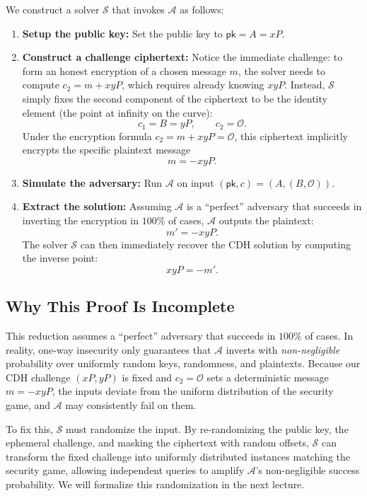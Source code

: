 We construct a solver \(\mathcal{S}\) that invokes \(\mathcal{A}\) as follows:
\begin{enumerate}
    \item \textbf{Setup the public key:} Set the public key to \(\mathsf{pk} = A = xP\).
    \item \textbf{Construct a challenge ciphertext:}
    Notice the immediate challenge: to form an honest encryption of a chosen message \(m\), the solver needs to compute \(c_2 = m + xyP\), which requires already knowing \(xyP\).
    Instead, \(\mathcal{S}\) simply fixes the second component of the ciphertext to be the identity element (the point at infinity on the curve):
    \[
        c_1 = B = yP, \qquad c_2 = \mathcal{O}.
    \]
    Under the encryption formula \(c_2 = m + xyP = \mathcal{O}\), this ciphertext implicitly encrypts the specific plaintext message
    \[
        m = -xyP.
    \]
    \item \textbf{Simulate the adversary:} Run \(\mathcal{A}\) on input \((\mathsf{pk}, c) = (A, (B, \mathcal{O}))\).
    \item \textbf{Extract the solution:} Assuming \(\mathcal{A}\) is a ``perfect'' adversary that succeeds in inverting the encryption in \(100\%\) of cases, \(\mathcal{A}\) outputs the plaintext:
    \[
        m' = -xyP.
    \]
    The solver \(\mathcal{S}\) can then immediately recover the CDH solution by computing the inverse point:
    \[
        xyP = -m'.
    \]
\end{enumerate}

\subsection*{Why This Proof Is Incomplete}

This reduction assumes a ``perfect'' adversary that succeeds in \(100\%\) of cases.
In reality, one-way insecurity only guarantees that \(\mathcal{A}\) inverts with \emph{non-negligible} probability over uniformly random keys, randomness, and plaintexts.
Because our CDH challenge \((xP, yP)\) is fixed and \(c_2 = \mathcal{O}\) sets a deterministic message \(m = -xyP\), the inputs deviate from the uniform distribution of the security game, and \(\mathcal{A}\) may consistently fail on them.

To fix this, \(\mathcal{S}\) must randomize the input.
By re-randomizing the public key, the ephemeral challenge, and masking the ciphertext with random offsets, \(\mathcal{S}\) can transform the fixed challenge into uniformly distributed instances matching the security game, allowing independent queries to amplify \(\mathcal{A}\)'s non-negligible success probability.
We will formalize this randomization in the next lecture.
